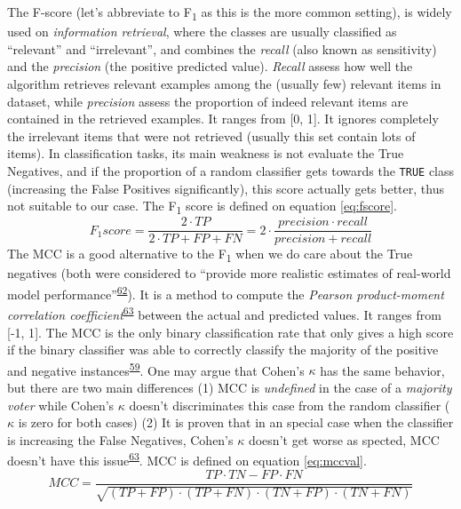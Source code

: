 \documentclass[12pt,twoside]{fmupthesis}
\begin{document}
The F-score (let's abbreviate to F\textsubscript{1} as this is the more common setting), is widely used on
\emph{information retrieval}, where the classes are usually classified as ``relevant'' and ``irrelevant'',
and combines the \emph{recall} (also known as sensitivity) and the \emph{precision} (the positive predicted
value). \emph{Recall} assess how well the algorithm retrieves relevant examples among the (usually few)
relevant items in dataset, while \emph{precision} assess the proportion of indeed relevant items are
contained in the retrieved examples. It ranges from {[}0, 1{]}. It ignores completely the irrelevant
items that were not retrieved (usually this set contain lots of items). In classification tasks, its
main weakness is not evaluate the True Negatives, and if the proportion of a random classifier gets
towards the \texttt{TRUE} class (increasing the False Positives significantly), this score actually gets
better, thus not suitable to our case. The F\textsubscript{1} score is defined on equation \eqref{eq:fscore}.
\begin{equation}
F_1 score = \frac{2 \cdot TP}{2 \cdot TP + FP + FN} = 2 \cdot \frac{precision \cdot recall}{precision + recall} \label{eq:fscore}
\end{equation}
The MCC is a good alternative to the F\textsubscript{1} when we do care about the True negatives (both were
considered to ``provide more realistic estimates of real-world model performance''\textsuperscript{\protect\hyperlink{ref-Dubey2018}{62}}). It
is a method to compute the \emph{Pearson product-moment correlation coefficient}\textsuperscript{\protect\hyperlink{ref-Delgado2019}{63}} between
the actual and predicted values. It ranges from {[}-1, 1{]}. The MCC is the only binary classification
rate that only gives a high score if the binary classifier was able to correctly classify the
majority of the positive and negative instances\textsuperscript{\protect\hyperlink{ref-Chicco2020}{59}}. One may argue that Cohen's \(\kappa\)
has the same behavior, but there are two main differences (1) MCC is \emph{undefined} in the case of a
\emph{majority voter} while Cohen's \(\kappa\) doesn't discriminates this case from the random classifier
(\(\kappa\) is zero for both cases) (2) It is proven that in an special case when the classifier is
increasing the False Negatives, Cohen's \(\kappa\) doesn't get worse as spected, MCC
doesn't have this issue\textsuperscript{\protect\hyperlink{ref-Delgado2019}{63}}. MCC is defined on equation \eqref{eq:mccval}.
\begin{equation}
MCC = \frac{TP \cdot TN - FP \cdot FN}{\sqrt{(TP + FP) \cdot (TP + FN) \cdot (TN + FP) \cdot (TN + FN)}} \label{eq:mccval}
\end{equation}
\end{document}
